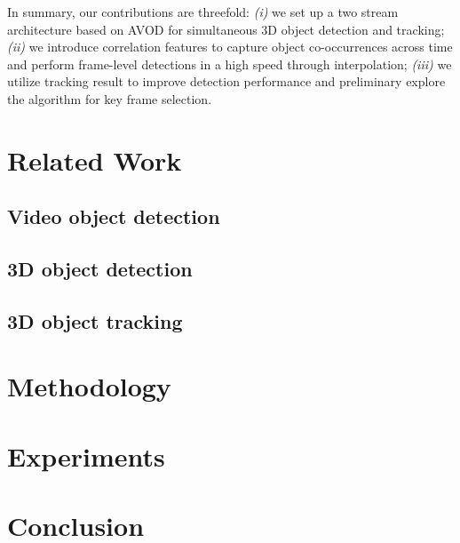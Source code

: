 \documentclass{bmvc2k}
\begin{document}
In summary, our contributions are threefold: \textit{(i)} we set up a two stream architecture based on AVOD for simultaneous 3D object detection and tracking; \textit{(ii)} we introduce correlation features to capture object co-occurrences across time and perform frame-level detections in a high speed through interpolation; \textit{(iii)} we utilize tracking result to improve detection performance and preliminary explore the algorithm for key frame selection. 

\section{Related Work}
\label{sec:related work}

\subsection{Video object detection}

\subsection{3D object detection}

\subsection{3D object tracking}

\section{Methodology}
\label{sec:method}


\section{Experiments}
\label{sec:experiments}


\section{Conclusion}
\label{sec:conclusion}



\end{document}
